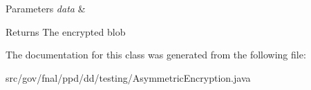 \begin{DoxyParams}{Parameters}
{\em data} & \\
\hline
\end{DoxyParams}
\begin{DoxyReturn}{Returns}
The encrypted blob 
\end{DoxyReturn}


The documentation for this class was generated from the following file\-:\begin{DoxyCompactItemize}
\item 
src/gov/fnal/ppd/dd/testing/Asymmetric\-Encryption.\-java\end{DoxyCompactItemize}

